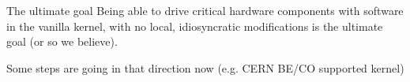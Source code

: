 \documentclass[compress,red]{beamer}
\begin{document}
\begin{frame}{The ultimate goal}
    Being able to drive critical hardware components with software
    in the vanilla kernel, with no local, idiosyncratic modifications
    is the ultimate goal (or so we believe).

    Some steps are going in that direction now (e.g. CERN BE/CO
    supported kernel)
\end{frame}
\end{document}
